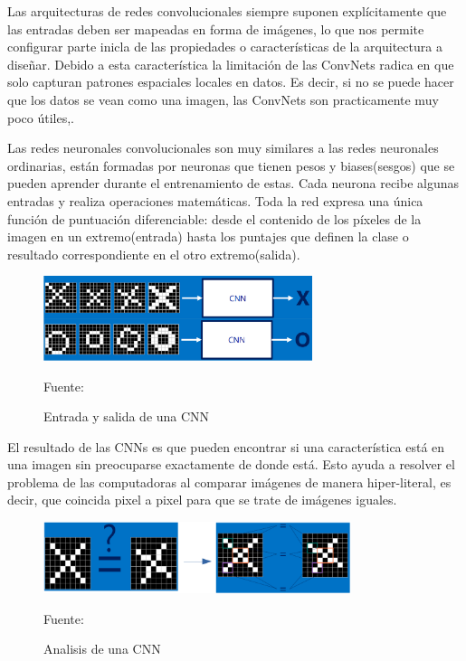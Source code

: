 	\vskip 0.4cm  
	Las arquitecturas de redes convolucionales siempre suponen explícitamente que las entradas deben ser mapeadas en forma de imágenes, lo que nos permite configurar parte inicla de las propiedades o características de la arquitectura a diseñar.  Debido a esta característica la limitación de las ConvNets radica en que solo capturan patrones espaciales locales en datos. Es decir, si no se puede hacer que los datos se vean como una imagen, las ConvNets son practicamente muy poco útiles,\citep{Rohrer}.

	\vskip 0.4cm  
	Las redes neuronales convolucionales son muy similares a las redes neuronales ordinarias, están formadas por neuronas que tienen pesos y biases(sesgos) que se pueden aprender durante el entrenamiento de estas. Cada neurona recibe algunas entradas y realiza operaciones matemáticas. Toda la red expresa una única función de puntuación diferenciable: desde el contenido de los píxeles de la imagen en un extremo(entrada) hasta los puntajes que definen la clase o resultado correspondiente en el otro extremo(salida).

	\begin{figure}[H]
	\begin{center}
	\includegraphics[width=0.7\textwidth]{images/marcoteorico/entr_salida}
	\end{center}
	\begin{center}
	\caption{\small{Entrada y salida de una CNN}}
	\vskip -0.25cm
	{\small{Fuente: \cite{Rohrer}}}
	\end{center}
	\vspace{-1.5em}
	\end{figure}

	El resultado de las CNNs es que pueden encontrar si una característica está en una imagen sin preocuparse exactamente de donde está. Esto ayuda a resolver el problema de las computadoras al comparar imágenes de manera hiper-literal, es decir, que coincida pixel a pixel para que se trate de imágenes iguales.

	\begin{figure}[H]
	\begin{center}
	\includegraphics[width=0.8\textwidth]{images/marcoteorico/literalcomp}
	\end{center}
	\begin{center}
	\caption{\small{Analisis de una CNN}}
	\vskip -0.25cm
	{\small{Fuente: \cite{Rohrer}}}
	\end{center}
	\vspace{-1.5em}
	\end{figure}

